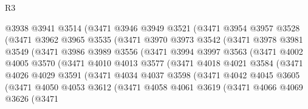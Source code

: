 \begin{lexlean}{R3}
\begin{coremodule}
                @3938
                @3941
                @3514
                (@3471
                  @3946
                  @3949
                  @3521
                  (@3471
                    @3954
                    @3957
                    @3528
                    (@3471
                      @3962
                      @3965
                      @3535
                      (@3471
                        @3970
                        @3973
                        @3542
                        (@3471
                          @3978
                          @3981
                          @3549
                          (@3471
                            @3986
                            @3989
                            @3556
                            (@3471
                              @3994
                              @3997
                              @3563
                              (@3471
                                @4002
                                @4005
                                @3570
                                (@3471
                                  @4010
                                  @4013
                                  @3577
                                  (@3471
                                    @4018
                                    @4021
                                    @3584
                                    (@3471
                                      @4026
                                      @4029
                                      @3591
                                      (@3471
                                        @4034
                                        @4037
                                        @3598
                                        (@3471
                                          @4042
                                          @4045
                                          @3605
                                          (@3471
                                            @4050
                                            @4053
                                            @3612
                                            (@3471
                                              @4058
                                              @4061
                                              @3619
                                              (@3471
                                                @4066
                                                @4069
                                                @3626
                                                (@3471

\end{coremodule}
\end{lexlean}
